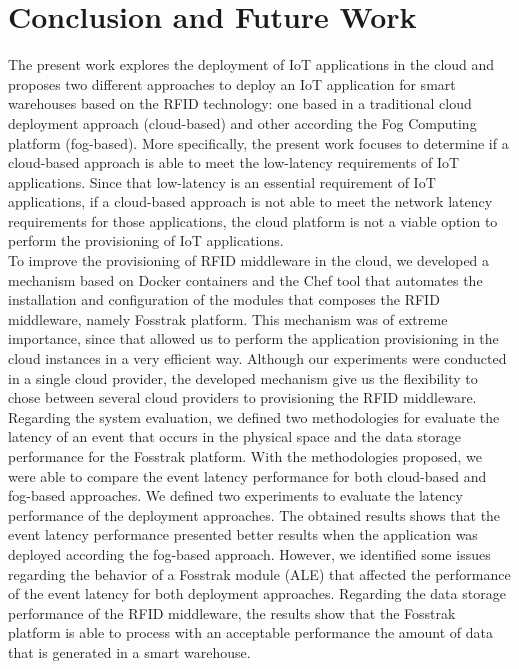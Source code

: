

\section{Conclusion and Future Work}
\label{sec:conclusion}
The present work explores the deployment of \gls{IoT} applications in the cloud and proposes
two different approaches to deploy an \gls{IoT} application for smart warehouses based on the
\gls{RFID} technology: one based in a traditional cloud deployment approach (cloud-based) and other
according the Fog Computing platform (fog-based). More specifically, the present work focuses to
determine if a cloud-based approach is able to meet the low-latency requirements of \gls{IoT}
applications. Since that low-latency is an essential requirement of \gls{IoT} applications, if a
cloud-based approach is not able to meet the network latency requirements for those applications,
the cloud platform is not a viable option to perform the provisioning of \gls{IoT} applications.\\

To improve the provisioning of \gls{RFID} middleware in the cloud, we developed a mechanism based on
Docker containers and the Chef tool that automates the installation and configuration of the modules
that composes the \gls{RFID} middleware, namely Fosstrak platform. This mechanism was of extreme
importance, since that allowed us to perform the application provisioning in the cloud instances in
a very efficient way. Although our experiments were conducted in a single cloud provider, the developed
mechanism give us the flexibility to chose between several cloud providers to provisioning the \gls{RFID} middleware.\\

Regarding the system evaluation, we defined two methodologies for evaluate the latency of an event that
occurs in the physical space and the data storage performance for the Fosstrak platform. With the
methodologies proposed, we were able to compare the event latency performance for both cloud-based
and fog-based approaches. We defined two experiments to evaluate the latency performance of the
deployment approaches. The obtained results shows that the event latency performance presented better
results when the application was deployed according the fog-based approach. However, we identified
some issues regarding the behavior of a Fosstrak module (\gls{ALE}) that affected the performance
of the event latency for both deployment approaches. Regarding the data storage performance of the
RFID middleware, the results show that the Fosstrak platform is able to process with an acceptable
performance the amount of data that is generated in a smart warehouse.

